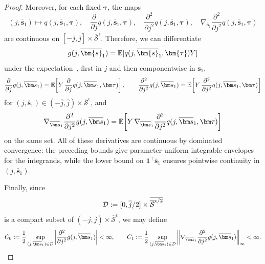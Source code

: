 \begin{proof}
  Moreover, for each fixed $\bm\tau$, the maps
  \[
    (j,\overline{\bm s}_1)\mapsto q(j,\overline{\bm s}_1,\bm\tau),
    \quad
    \frac{\partial}{\partial j}q(j,\overline{\bm s}_1,\bm\tau),
    \quad
    \frac{\partial^2}{\partial j^2}q(j,\overline{\bm s}_1,\bm\tau),
    \quad
    \nabla_{\overline{\bm s}_1}\frac{\partial^2}{\partial j^2}q(j,\overline{\bm s}_1,\bm\tau)
  \]
  are continuous on $[-\overline j,\overline j]\times \overline{\overline{\mathcal{S}}^\epsilon}$.
  Therefore, we can differentiate
  \[
    g(j,\overline{\bm{s}}_1) = \E[q(j,\overline{\bm{s}}_1,\bm{\tau}) Y]
  \]
  under the expectation~\cite[Theorem~2.27]{Folland99}, first in $j$ and then componentwise in $\overline{\bm s}_1$,
  \[
    \frac{\partial}{\partial j}g(j,\overline{\bm s}_1)
    =
    \E\!\left[
      Y\,
      \frac{\partial}{\partial j}q(j,\overline{\bm s}_1,\bm\tau)
    \right],
    \qquad
    \frac{\partial^2}{\partial j^2}g(j,\overline{\bm s}_1)
    =
    \E\!\left[
      Y\,
      \frac{\partial^2}{\partial j^2}q(j,\overline{\bm s}_1,\bm\tau)
    \right]
  \]
  for $(j,\overline{\bm s}_1)\in(-\overline j,\overline j)\times \overline{\mathcal{S}}^\epsilon$, and
  \[
    \nabla_{\overline{\bm s}_1}\frac{\partial^2}{\partial j^2}g(j,\overline{\bm s}_1)
    =
    \E\!\left[
      Y\,
      \nabla_{\overline{\bm s}_1}\frac{\partial^2}{\partial j^2}q(j,\overline{\bm s}_1,\bm\tau)
    \right]
  \]
  on the same set.
  All of these derivatives are continuous by dominated convergence: the preceding bounds give parameter-uniform integrable envelopes for the integrands, while the lower bound on \(\bm 1^\top\overline{\bm s}_1\) ensures pointwise continuity in \((j,\overline{\bm s}_1)\).

  Finally, since
  \[
    \mathcal D:=[0,\overline j / 2]\times \overline{\overline{\mathcal{S}}^{\epsilon/2}}
  \]
  is a compact subset of $(-\overline j,\overline j)\times\overline{\mathcal{S}}^{\epsilon}$, we may define
  \[
    C_0\defeq\frac{1}{2}\sup_{(j,\overline{\bm s}_1)\in\mathcal D}\left|
    \frac{\partial^2}{\partial j^2}g(j,\overline{\bm s}_1)
    \right|<\infty,
    \qquad
    C_1\defeq\frac{1}{2}\sup_{(j,\overline{\bm s}_1)\in\mathcal D}\left\|
    \nabla_{\overline{\bm s}_1}\frac{\partial^2}{\partial j^2}g(j,\overline{\bm s}_1)
    \right\|_\infty<\infty.
  \]


\end{proof}
